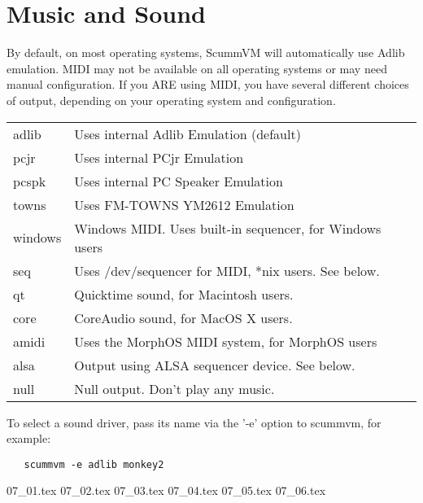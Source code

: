 

\section{Music and Sound}
By default, on most operating systems, ScummVM will automatically use Adlib
emulation. MIDI may not be available on all operating systems or may need
manual configuration. If you ARE using MIDI, you have several different
choices of output, depending on your operating system and configuration.

\begin{tabular}[h]{ll}
  adlib     & Uses internal Adlib Emulation (default)\\
  pcjr      & Uses internal PCjr Emulation \\
  pcspk     & Uses internal PC Speaker Emulation\\
  towns     & Uses FM-TOWNS YM2612 Emulation\\
  windows   & Windows MIDI. Uses built-in sequencer, for Windows users\\
  seq       & Uses /dev/sequencer for MIDI, *nix users. See below.\\
  qt        & Quicktime sound, for Macintosh users.\\
  core      & CoreAudio sound, for MacOS X users.\\
  amidi     & Uses the MorphOS MIDI system, for MorphOS users\\
  alsa      & Output using ALSA sequencer device. See below.\\
  null      & Null output. Don't play any music.\\
\end{tabular}

To select a sound driver, pass its name via the '-e' option to scummvm,
for example:
\begin{verbatim}
   scummvm -e adlib monkey2
\end{verbatim}

 {07_01.tex}
 {07_02.tex}
 {07_03.tex}
 {07_04.tex}
 {07_05.tex}
 {07_06.tex}
